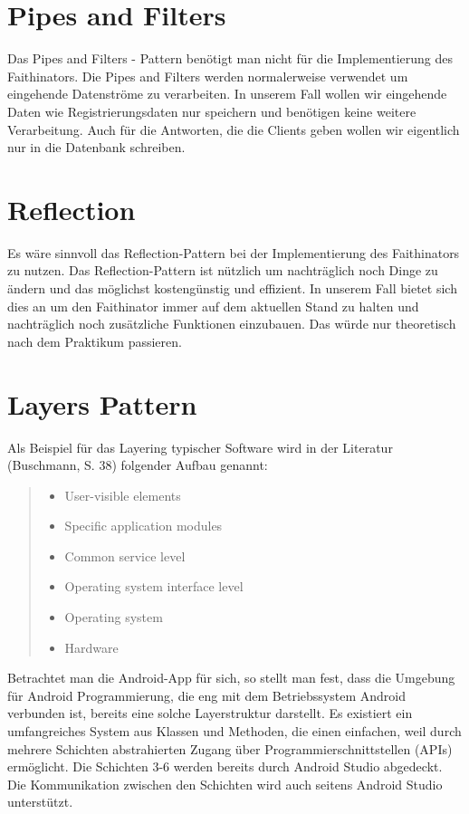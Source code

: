 \documentclass{scrreprt}
\begin{document}
\chapter{Pipes and Filters}
Das Pipes and Filters - Pattern benötigt man nicht für die Implementierung des Faithinators. Die Pipes and Filters werden normalerweise verwendet um eingehende Datenströme zu verarbeiten. In unserem Fall wollen wir eingehende Daten wie Registrierungsdaten nur speichern und benötigen keine weitere Verarbeitung. Auch für die Antworten, die die Clients geben wollen wir eigentlich nur in die Datenbank schreiben.
\chapter{Reflection}
Es wäre sinnvoll das Reflection-Pattern bei der Implementierung des Faithinators zu nutzen. Das Reflection-Pattern ist nützlich um nachträglich noch Dinge zu ändern und das möglichst kostengünstig und effizient. In unserem Fall bietet sich dies an um den Faithinator immer auf dem aktuellen Stand zu halten und nachträglich noch zusätzliche Funktionen einzubauen. Das würde nur theoretisch nach dem  Praktikum passieren.

\chapter{Layers Pattern}
Als Beispiel für das Layering typischer Software wird in der Literatur (Buschmann, S. 38) folgender Aufbau genannt:

\begin{quote}
\begin{itemize}
 \item User-visible elements
 \item Specific application modules
 \item Common service level
 \item Operating system interface level
 \item Operating system
 \item Hardware
\end{itemize}
\end{quote}

Betrachtet man die Android-App für sich, so stellt man fest, dass die Umgebung für Android Programmierung, die eng mit dem Betriebssystem Android verbunden ist, bereits eine solche Layerstruktur darstellt. Es existiert ein umfangreiches System aus Klassen und Methoden, die einen einfachen, weil durch mehrere Schichten abstrahierten Zugang über Programmierschnittstellen (APIs) ermöglicht. Die Schichten 3-6 werden bereits durch Android Studio abgedeckt. Die Kommunikation zwischen den Schichten wird auch seitens Android Studio unterstützt.
\end{document}
